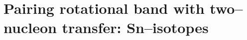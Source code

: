 \section[Pairing rotational bands]{Pairing rotational band with two--nucleon transfer: Sn--isotopes}\label{C8S2}

%
%
